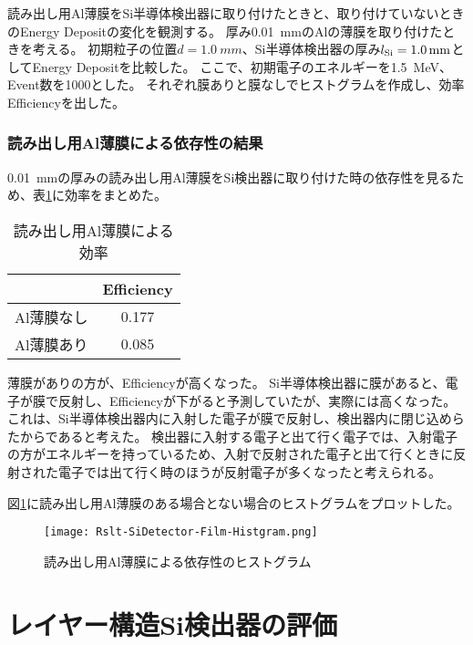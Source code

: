 \documentclass[a4paper,10pt]{jreport}
\begin{document}
読み出し用Al薄膜をSi半導体検出器に取り付けたときと、取り付けていないときのEnergy Depositの変化を観測する。
厚み\SI{0.01}{mm}のAlの薄膜を取り付けたときを考える。
初期粒子の位置$d=\SI{1.0}{mm}$、Si半導体検出器の厚み$l_{\rm{Si}}=\SI{1.0}{mm}$としてEnergy Depositを比較した。
ここで、初期電子のエネルギーを\SI{1.5}{MeV}、Event数を1000とした。
それぞれ膜ありと膜なしでヒストグラムを作成し、効率Efficiencyを出した。




\subsection{読み出し用Al薄膜による依存性の結果}

\SI{0.01}{mm}の厚みの読み出し用Al薄膜をSi検出器に取り付けた時の依存性を見るため、表\ref{Tab-SiDetector-Film-Efficiency}に効率をまとめた。

\begin{table}[H] 
	\center
	\caption{読み出し用Al薄膜による効率} \label{Tab-SiDetector-Film-Efficiency}
	\begin{tabular}{cc}
		\hline
		 & Efficiency \\
		\hline
		Al薄膜なし & 0.177 \\
		Al薄膜あり & 0.085 \\
		\hline
	\end{tabular}
\end{table}

薄膜がありの方が、Efficiencyが高くなった。
Si半導体検出器に膜があると、電子が膜で反射し、Efficiencyが下がると予測していたが、実際には高くなった。
これは、Si半導体検出器内に入射した電子が膜で反射し、検出器内に閉じ込めらたからであると考えた。
検出器に入射する電子と出て行く電子では、入射電子の方がエネルギーを持っているため、入射で反射された電子と出て行くときに反射された電子では出て行く時のほうが反射電子が多くなったと考えられる。

図\ref{Rslt-SiDetector-Film-Histgram}に読み出し用Al薄膜のある場合とない場合のヒストグラムをプロットした。

\begin{figure}[H]
	\center
	\texttt{[image: Rslt-SiDetector-Film-Histgram.png]}
	\caption{読み出し用Al薄膜による依存性のヒストグラム} \label{Rslt-SiDetector-Film-Histgram}
\end{figure}




\chapter{レイヤー構造Si検出器の評価}
\end{document}
